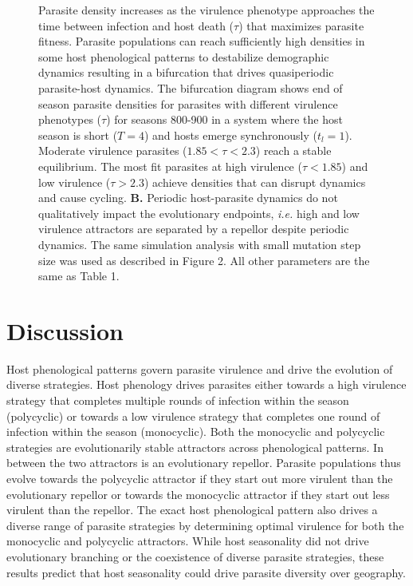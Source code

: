 \documentclass{article}
\begin{document}
\begin{figure}[hb!]
{    Parasite density increases as the virulence phenotype approaches the time between infection and host death ($\tau$) that maximizes parasite fitness\cite{macdonald2021host}. Parasite populations can reach sufficiently high densities in some host phenological patterns to destabilize demographic dynamics resulting in a bifurcation that drives quasiperiodic parasite-host dynamics. The bifurcation diagram shows end of season parasite densities for parasites with different virulence phenotypes ($\tau$) for seasons 800-900 in a system where the host season is short ($T=4$) and hosts emerge synchronously ($t_{l}=1$). Moderate virulence parasites ($1.85<\tau<2.3$) reach a stable  equilibrium. The most fit parasites at high virulence ($\tau<1.85$) and low virulence ($\tau>2.3$) achieve densities that can disrupt dynamics and cause cycling. \textbf{B.} Periodic host-parasite dynamics do not qualitatively impact the evolutionary endpoints, \textit{i.e.} high and low virulence attractors are separated by a repellor despite periodic dynamics. The same simulation analysis with small mutation step size was used as described in Figure 2. All other parameters are the same as Table 1.
    }
\end{figure}


\section*{Discussion}
Host phenological patterns govern parasite virulence and drive the evolution of diverse strategies. Host phenology drives parasites either towards a high virulence strategy that completes multiple rounds of infection within the season (polycyclic) or towards a low virulence strategy that completes one round of infection within the season (monocyclic). Both the monocyclic and polycyclic strategies are evolutionarily stable attractors across phenological patterns. In between the two attractors is an evolutionary repellor. Parasite populations thus evolve towards the polycyclic attractor if they start out more virulent than the evolutionary repellor or towards the monocyclic attractor if they start out less virulent than the repellor. The exact host phenological pattern also drives a diverse range of parasite strategies by determining optimal virulence for both the monocyclic and polycyclic attractors. While host seasonality did not drive evolutionary branching or the coexistence of diverse parasite strategies, these results predict that host seasonality could drive parasite diversity over geography.
\end{document}
